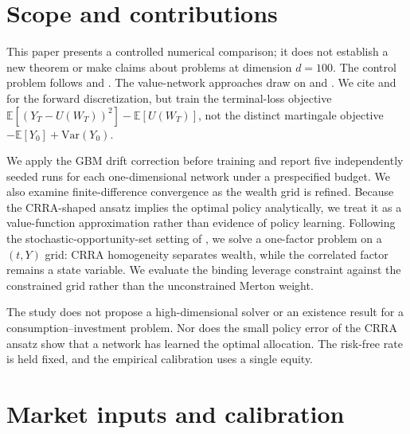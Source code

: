 \documentclass[11pt,a4paper]{article}
\newcommand{\E}{\mathbb{E}}
\begin{document}
\section{Scope and contributions}
\label{sec:claim}

This paper presents a controlled numerical comparison; it does not establish a new theorem or make claims about problems at dimension $d=100$. The control problem follows \citet{merton1969} and \citet{merton1971}. The value-network approaches draw on \citet{raissi2019} and \citet{sirignano2018}. We cite \citet{e2017} and \citet{han2018} for the forward discretization, but train the terminal-loss objective $\E[(Y_T-U(W_T))^2]-\E[U(W_T)]$, not the distinct martingale objective $-\E[Y_0]+\mathrm{Var}(Y_0)$.

We apply the GBM drift correction before training and report five independently seeded runs for each one-dimensional network under a prespecified budget. We also examine finite-difference convergence as the wealth grid is refined. Because the CRRA-shaped ansatz implies the optimal policy analytically, we treat it as a value-function approximation rather than evidence of policy learning. Following the stochastic-opportunity-set setting of \citet{kim1996}, we solve a one-factor problem on a $(t,Y)$ grid: CRRA homogeneity separates wealth, while the correlated factor remains a state variable. We evaluate the binding leverage constraint against the constrained grid rather than the unconstrained Merton weight.

The study does not propose a high-dimensional solver or an existence result for a consumption--investment problem. Nor does the small policy error of the CRRA ansatz show that a network has learned the optimal allocation. The risk-free rate is held fixed, and the empirical calibration uses a single equity.

\section{Market inputs and calibration}
\label{sec:market}
\end{document}
